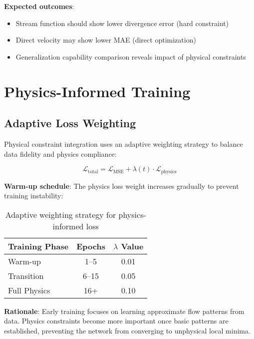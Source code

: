 \textbf{Expected outcomes}:
\begin{itemize}
    \item Stream function should show lower divergence error (hard constraint)
    \item Direct velocity may show lower MAE (direct optimization)
    \item Generalization capability comparison reveals impact of physical constraints
\end{itemize}

\section{Physics-Informed Training}
\label{sec:physics_informed}

\subsection{Adaptive Loss Weighting}

Physical constraint integration uses an adaptive weighting strategy to balance data fidelity and physics compliance:

\begin{equation}
\mathcal{L}_{\text{total}} = \mathcal{L}_{\text{MSE}} + \lambda(t) \cdot \mathcal{L}_{\text{physics}}
\end{equation}

\textbf{Warm-up schedule}: The physics loss weight increases gradually to prevent training instability:

\begin{table}[htbp]
\centering
\caption{Adaptive weighting strategy for physics-informed loss}
\label{tab:lambda_schedule}
\begin{tabular}{@{}lcc@{}}
\toprule
\textbf{Training Phase} & \textbf{Epochs} & \textbf{$\lambda$ Value} \\
\midrule
Warm-up & 1--5 & 0.01 \\
Transition & 6--15 & 0.05 \\
Full Physics & 16+ & 0.10 \\
\bottomrule
\end{tabular}
\end{table}

\textbf{Rationale}: Early training focuses on learning approximate flow patterns from data. Physics constraints become more important once basic patterns are established, preventing the network from converging to unphysical local minima.

